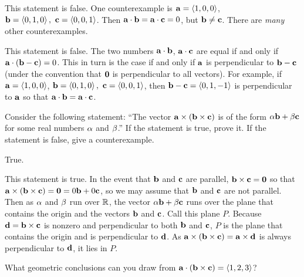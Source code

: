 \begin{answer}
This statement is false. One counterexample is $\mathbf{a}=\left< 1,0,0\right> $,
$\mathbf{b}=\left< 0,1,0\right> ,\ \mathbf{c}=\left< 0,0,1\right> $. Then $\mathbf{a}\cdot\mathbf{b}=\mathbf{a}\cdot\mathbf{c}=0$, but $\mathbf{b}\ne\mathbf{c}$. There are \emph{many} other counterexamples.
\end{answer}

\begin{solution}
This statement is false. The two numbers 
$\mathbf{a}\cdot\mathbf{b}$, $\mathbf{a}\cdot\mathbf{c}$ are equal if and only if
$\mathbf{a}\cdot(\mathbf{b}-\mathbf{c})= 0$. This in turn is the case if and only
if $\mathbf{a}$ is perpendicular to $\mathbf{b}-\mathbf{c}$ (under the convention that
$\mathbf{0}$ is perpendicular to all vectors). For example, 
if $\mathbf{a}=\left< 1,0,0\right> $, $\mathbf{b}=\left< 0,1,0\right> ,\ \mathbf{c}=\left< 0,0,1\right> $, then $\mathbf{b}-\mathbf{c}=\left< 0,1,-1\right>$ is perpendicular to $\mathbf{a}$ so that 
$\mathbf{a}\cdot\mathbf{b}=\mathbf{a}\cdot\mathbf{c}$.
\end{solution}

\begin{question}\label{PRB Qnine}
Consider the following statement: ``The vector $\mathbf{a}\times(\mathbf{b}\times\mathbf{c})$ 
is of the form $\alpha\mathbf{b}+\beta\mathbf{c}$ for some real numbers $\alpha$ and $\beta$.''
If the statement is true, prove it. If the statement is false, give a 
counterexample.

\end{question}


\begin{answer}
True.
\end{answer}

\begin{solution}
This statement is true. In the event that $\mathbf{b}$ and 
$\mathbf{c}$ are parallel, $\mathbf{b}\times\mathbf{c}=\mathbf{0}$ so that
$\mathbf{a}\times(\mathbf{b}\times\mathbf{c})=\mathbf{0}=0\mathbf{b}+0\mathbf{c}$, so we may assume
that $\mathbf{b}$ and $\mathbf{c}$ are not parallel. Then as $\alpha$ and $\beta$ run
over $\mathbb{R}$, the vector $\alpha\mathbf{b}+\beta \mathbf{c}$ runs over the plane that
contains the origin and the vectors $\mathbf{b}$ and $\mathbf{c}$. Call this plane
$P$. Because
$\mathbf{d}=\mathbf{b}\times\mathbf{c}$ is nonzero and perpendicular to both 
$\mathbf{b}$ and $\mathbf{c}$, $P$ is the plane that contains the origin
and is perpendicular to $\mathbf{d}$. As $\mathbf{a}\times(\mathbf{b}\times\mathbf{c})=\mathbf{a}\times\mathbf{d}$ is always perpendicular to $\mathbf{d}$, it lies in $P$.
\end{solution}

\begin{question}
What geometric conclusions can you draw from
$\mathbf{a}\cdot(\mathbf{b}\times\mathbf{c})=\left< 1,2,3\right>$?
\end{question}

